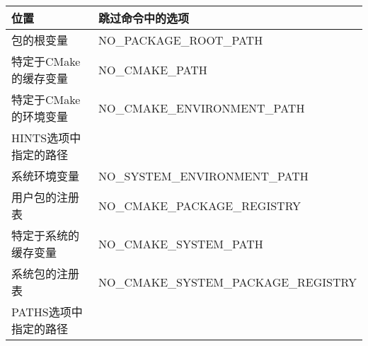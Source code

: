 \begin{table}[H]
	\centering
	\begin{tabular}{|l|l|}
		\hline
		\textbf{位置}                     & \textbf{跳过命令中的选项}  \\ \hline
		包的根变量                & NO\_PACKAGE\_ROOT\_PATH              \\ \hline
		特定于CMake的缓存变量        & NO\_CMAKE\_PATH                      \\ \hline
		特定于CMake的环境变量  & NO\_CMAKE\_ENVIRONMENT\_PATH         \\ \hline
		HINTS选项中指定的路径  &                                      \\ \hline
		系统环境变量 & NO\_SYSTEM\_ENVIRONMENT\_PATH        \\ \hline
		用户包的注册表                 & NO\_CMAKE\_PACKAGE\_REGISTRY         \\ \hline
		特定于系统的缓存变量       & NO\_CMAKE\_SYSTEM\_PATH              \\ \hline
		系统包的注册表               & NO\_CMAKE\_SYSTEM\_PACKAGE\_REGISTRY \\ \hline
		PATHS选项中指定的路径   &                                      \\ \hline
	\end{tabular}
\end{table}

